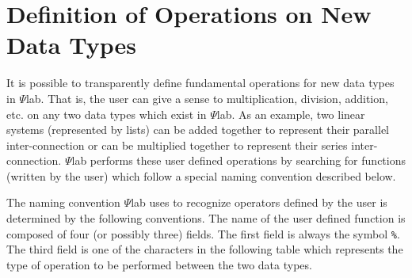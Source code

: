 \section{Definition of Operations on New Data Types}
\label{s4.3}

	It is possible to transparently define fundamental operations 
for new data types in $\Psi$lab.
That is, the user can give a sense to multiplication, division, addition, etc.
on any two data types which exist in $\Psi$lab.  As an example, two linear
systems (represented by lists)
can be added together to represent their parallel inter-connection
or can be multiplied together to represent their series inter-connection.
$\Psi$lab performs these user defined operations by searching for functions
(written by the user) which follow a special naming convention described
below.

	The naming convention $\Psi$lab uses to recognize operators 
defined by the user is determined by the following conventions.  The name
of the user defined function is composed of four (or possibly three)
fields.  The first field is always the symbol {\tt \%}.  
The third field is one of the characters in the following table
which represents the type of operation to be performed between the
two data types.

